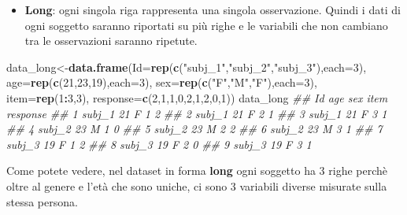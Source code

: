 \documentclass[
]{book}
\newenvironment{Shaded}{\begin{snugshade}}{\end{snugshade}}
\newcommand{\CommentTok}[1]{\textcolor[rgb]{0.56,0.35,0.01}{\textit{#1}}}
\newcommand{\DataTypeTok}[1]{\textcolor[rgb]{0.13,0.29,0.53}{#1}}
\newcommand{\DecValTok}[1]{\textcolor[rgb]{0.00,0.00,0.81}{#1}}
\newcommand{\KeywordTok}[1]{\textcolor[rgb]{0.13,0.29,0.53}{\textbf{#1}}}
\newcommand{\NormalTok}[1]{#1}
\newcommand{\OperatorTok}[1]{\textcolor[rgb]{0.81,0.36,0.00}{\textbf{#1}}}
\newcommand{\StringTok}[1]{\textcolor[rgb]{0.31,0.60,0.02}{#1}}
\providecommand{\tightlist}{%
  \setlength{\itemsep}{0pt}\setlength{\parskip}{0pt}}
\begin{document}
\begin{itemize}
\tightlist
\item
  \textbf{Long}: ogni singola riga rappresenta una singola osservazione. Quindi i dati di ogni soggetto saranno riportati su più righe e le variabili che non cambiano tra le osservazioni saranno ripetute.
\end{itemize}

\begin{Shaded}
\begin{Highlighting}[]
\NormalTok{data_long<-}\KeywordTok{data.frame}\NormalTok{(}\DataTypeTok{Id=}\KeywordTok{rep}\NormalTok{(}\KeywordTok{c}\NormalTok{(}\StringTok{"subj_1"}\NormalTok{,}\StringTok{"subj_2"}\NormalTok{,}\StringTok{"subj_3"}\NormalTok{),}\DataTypeTok{each=}\DecValTok{3}\NormalTok{),}
                      \DataTypeTok{age=}\KeywordTok{rep}\NormalTok{(}\KeywordTok{c}\NormalTok{(}\DecValTok{21}\NormalTok{,}\DecValTok{23}\NormalTok{,}\DecValTok{19}\NormalTok{),}\DataTypeTok{each=}\DecValTok{3}\NormalTok{),}
                      \DataTypeTok{sex=}\KeywordTok{rep}\NormalTok{(}\KeywordTok{c}\NormalTok{(}\StringTok{"F"}\NormalTok{,}\StringTok{"M"}\NormalTok{,}\StringTok{"F"}\NormalTok{),}\DataTypeTok{each=}\DecValTok{3}\NormalTok{),}
                      \DataTypeTok{item=}\KeywordTok{rep}\NormalTok{(}\DecValTok{1}\OperatorTok{:}\DecValTok{3}\NormalTok{,}\DecValTok{3}\NormalTok{),}
                      \DataTypeTok{response=}\KeywordTok{c}\NormalTok{(}\DecValTok{2}\NormalTok{,}\DecValTok{1}\NormalTok{,}\DecValTok{1}\NormalTok{,}\DecValTok{0}\NormalTok{,}\DecValTok{2}\NormalTok{,}\DecValTok{1}\NormalTok{,}\DecValTok{2}\NormalTok{,}\DecValTok{0}\NormalTok{,}\DecValTok{1}\NormalTok{))}
\NormalTok{data_long}
\CommentTok{##       Id age sex item response}
\CommentTok{## 1 subj_1  21   F    1        2}
\CommentTok{## 2 subj_1  21   F    2        1}
\CommentTok{## 3 subj_1  21   F    3        1}
\CommentTok{## 4 subj_2  23   M    1        0}
\CommentTok{## 5 subj_2  23   M    2        2}
\CommentTok{## 6 subj_2  23   M    3        1}
\CommentTok{## 7 subj_3  19   F    1        2}
\CommentTok{## 8 subj_3  19   F    2        0}
\CommentTok{## 9 subj_3  19   F    3        1}
\end{Highlighting}
\end{Shaded}

Come potete vedere, nel dataset in forma \textbf{long} ogni soggetto ha 3 righe perchè oltre al genere e l'età che sono uniche, ci sono 3 variabili diverse misurate sulla stessa persona.
\end{document}
